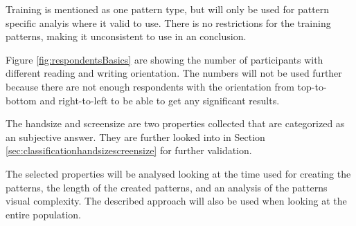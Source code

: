     Training is mentioned as one pattern type, but will only be used for pattern specific analyis where it valid to use. There is no restrictions for the training patterns, making it unconsistent to use in an conclusion. 

    Figure \ref{fig:respondentsBasics} are showing the number of participants with different reading and writing orientation. The numbers will not be used further because there are not enough respondents with the orientation from top-to-bottom and right-to-left to be able to get any significant results.

    The handsize and screensize are two properties collected that are categorized as an subjective answer. They are further looked into in Section \ref{sec:classificationhandsizescreensize} for further validation.     

    The selected properties will be analysed looking at the time used for creating the patterns, the length of the created patterns, and an analysis of the patterns visual complexity. The described approach will also be used when looking at the entire population. 